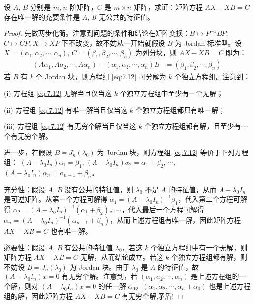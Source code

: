\documentclass[../../main.tex]{subfiles}%
\begin{document}
\begin{proposition}\label{proposition:AX-XB线性映射相关等价条件--(3)}
设 $A$, $B$ 分别是 $m$, $n$ 阶矩阵，$C$ 是 $m\times n$ 矩阵，求证：矩阵方程 $AX - XB = C$ 存在唯一解的充要条件是 $A$, $B$ 无公共的特征值。
\end{proposition}
\begin{proof}

先做两步化简。注意到问题的条件和结论在矩阵变换：$B\mapsto P^{-1}BP$, $C\mapsto CP$, $X\mapsto XP$ 下不改变，故不妨从一开始就假设 $B$ 为 Jordan 标准型。设 $X = (\alpha_1,\alpha_2,\cdots,\alpha_n)$, $C = (\beta_1,\beta_2,\cdots,\beta_n)$ 为列分块，则 $AX - XB = C$ 即为：
\begin{align}
(A\alpha_1,A\alpha_2,\cdots,A\alpha_n) - (\alpha_1,\alpha_2,\cdots,\alpha_n)B &= (\beta_1,\beta_2,\cdots,\beta_n).\label{eq:7.12}
\end{align}
若 $B$ 有 $k$ 个 Jordan 块，则方程组 \eqref{eq:7.12} 可分解为 $k$ 个独立方程组。注意到：

(i) 方程组 \eqref{eq:7.12} 无解当且仅当这 $k$ 个独立方程组中至少有一个无解；

(ii) 方程组 \eqref{eq:7.12} 有唯一解当且仅当这 $k$ 个独立方程组都只有唯一解；

(iii) 方程组 \eqref{eq:7.12} 有无穷个解当且仅当这 $k$ 个独立方程组都有解，且至少有一个有无穷个解。

进一步，若假设 $B = J_n(\lambda_0)$ 为 Jordan 块，则方程组 \eqref{eq:7.12} 等价于下列方程组：
$(A - \lambda_0I_n)\alpha_1 = \beta_1$, $(A - \lambda_0I_n)\alpha_2 = \alpha_1 + \beta_2$, $\cdots$, $(A - \lambda_0I_n)\alpha_n = \alpha_{n - 1} + \beta_n$。

{\heiti 充分性：}假设 $A$, $B$ 没有公共的特征值，则 $\lambda_0$ 不是 $A$ 的特征值，从而 $A - \lambda_0I_n$ 是可逆矩阵。从第一个方程可解得 $\alpha_1 = (A - \lambda_0I_n)^{-1}\beta_1$，代入第二个方程可解得 $\alpha_2 = (A - \lambda_0I_n)^{-1}(\alpha_1 + \beta_2)$，$\cdots$，代入最后一个方程可解得 $\alpha_n = (A - \lambda_0I_n)^{-1}(\alpha_{n - 1} + \beta_n)$，从而上述方程组有唯一解，因此矩阵方程 $AX - XB = C$ 也有唯一解。

{\heiti 必要性：}假设 $A$, $B$ 有公共的特征值 $\lambda_0$，若这 $k$ 个独立方程组中有一个无解，则矩阵方程 $AX - XB = C$ 无解，从而结论成立。若这 $k$ 个独立方程组都有解，则不妨设 $B = J_n(\lambda_0)$ 为 Jordan 块。由于 $\lambda_0$ 是 $A$ 的特征值，故 $(A - \lambda_0I_n)x = 0$ 有无穷个解。注意到，若 $(\alpha_1,\alpha_2,\cdots,\alpha_n)$ 是上述方程组的一个解，则对 $(A - \lambda_0I_n)x = 0$ 的任一解 $\alpha_0$，$(\alpha_1,\alpha_2,\cdots,\alpha_n + \alpha_0)$ 也是上述方程组的解，因此矩阵方程 $AX - XB = C$ 有无穷个解,矛盾!

\end{proof}
\end{document}
